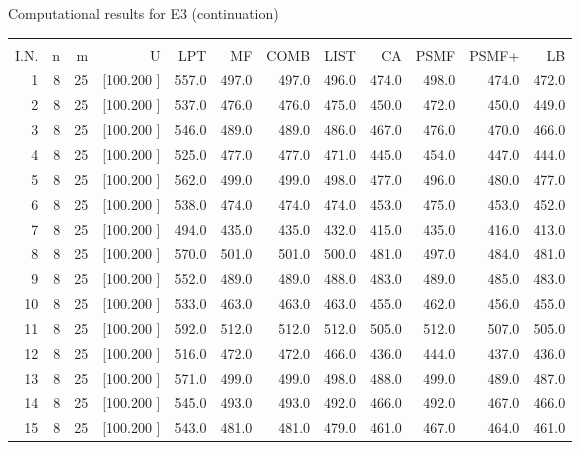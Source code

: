 \documentclass[12pt,a4paper]{article}
\begin{document}
\newpage
\begin{center}
 Computational results for E3 (continuation) {\tiny
\begin{tabular}{r r r r r r r r r r r r}\hline
    &   &   &          &        &        &        &        &        &        &        &       \\[-0.1in]
  I.N.  &  n  &  m  &  U  &  LPT  &  MF  &  COMB  &  LIST  &  CA  & PSMF &PSMF+ & LB \\[0.03in]
\hline
   1&  8& 25&[100.200   ]&   557.0&   497.0&   497.0&   496.0&   474.0&   498.0&   474.0&   472.0\\[-0.02in]
   2&  8& 25&[100.200   ]&   537.0&   476.0&   476.0&   475.0&   450.0&   472.0&   450.0&   449.0\\[-0.02in]
   3&  8& 25&[100.200   ]&   546.0&   489.0&   489.0&   486.0&   467.0&   476.0&   470.0&   466.0\\[-0.02in]
   4&  8& 25&[100.200   ]&   525.0&   477.0&   477.0&   471.0&   445.0&   454.0&   447.0&   444.0\\[-0.02in]
   5&  8& 25&[100.200   ]&   562.0&   499.0&   499.0&   498.0&   477.0&   496.0&   480.0&   477.0\\[-0.02in]
   6&  8& 25&[100.200   ]&   538.0&   474.0&   474.0&   474.0&   453.0&   475.0&   453.0&   452.0\\[-0.02in]
   7&  8& 25&[100.200   ]&   494.0&   435.0&   435.0&   432.0&   415.0&   435.0&   416.0&   413.0\\[-0.02in]
   8&  8& 25&[100.200   ]&   570.0&   501.0&   501.0&   500.0&   481.0&   497.0&   484.0&   481.0\\[-0.02in]
   9&  8& 25&[100.200   ]&   552.0&   489.0&   489.0&   488.0&   483.0&   489.0&   485.0&   483.0\\[-0.02in]
  10&  8& 25&[100.200   ]&   533.0&   463.0&   463.0&   463.0&   455.0&   462.0&   456.0&   455.0\\[-0.02in]
  11&  8& 25&[100.200   ]&   592.0&   512.0&   512.0&   512.0&   505.0&   512.0&   507.0&   505.0\\[-0.02in]
  12&  8& 25&[100.200   ]&   516.0&   472.0&   472.0&   466.0&   436.0&   444.0&   437.0&   436.0\\[-0.02in]
  13&  8& 25&[100.200   ]&   571.0&   499.0&   499.0&   498.0&   488.0&   499.0&   489.0&   487.0\\[-0.02in]
  14&  8& 25&[100.200   ]&   545.0&   493.0&   493.0&   492.0&   466.0&   492.0&   467.0&   466.0\\[-0.02in]
  15&  8& 25&[100.200   ]&   543.0&   481.0&   481.0&   479.0&   461.0&   467.0&   464.0&   461.0\\[-0.02in]

\end{tabular}}
\end{center}
\end{document}
